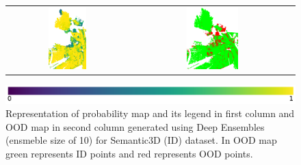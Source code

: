 \begin{figure}[h!]
\begin{tabular}{cc}
            \includegraphics[width=0.33\textwidth, height=0.18\textheight]{images/ood_imgs/de_sem3d/de_prob_10_3.pdf}& 
            \includegraphics[width=0.33\textwidth, height=0.18\textheight]{images/ood_imgs/de_sem3d/de_ood_auroc_3.pdf}\\
        \end{tabular}
        \includegraphics[scale=0.45]{images/prob_legend.pdf}
        \caption{Representation of probability map and its legend in first column and OOD map in second column generated using Deep Ensembles (ensmeble size of 10) for Semantic3D (ID) dataset. In OOD map green represents ID points and red represents OOD points.}
        \label{fig:de_ood_auroc_sem3d_prob}
    \end{figure}
